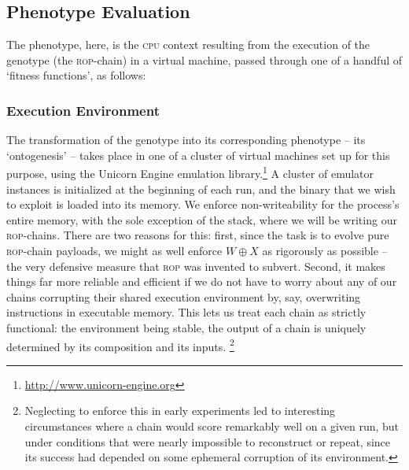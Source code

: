 \subsection{Phenotype Evaluation}
The phenotype, here, is the \textsc{cpu} context resulting from the execution of the genotype (the \textsc{rop}-chain) in a virtual machine, passed through one of a handful of `fitness functions', as follows:
\subsubsection{Execution Environment}
The transformation of the genotype into its corresponding
phenotype -- its `ontogenesis' -- takes place in one of a cluster
of virtual machines set up for this purpose, using the Unicorn Engine emulation library.\footnote{\url{http://www.unicorn-engine.org}} A cluster of
emulator instances is initialized at the beginning of each run,
and the binary that we wish to exploit is loaded into its memory.
We enforce non-writeability for the process's entire memory, with
the sole exception of the stack, where we will be writing our
\textsc{rop}-chains. There are two reasons for this: first, since
the task is to evolve pure \textsc{rop}-chain payloads, we might
as well enforce $W \oplus X$ as rigorously as possible -- the
very defensive measure that \textsc{rop} was invented to subvert.
Second, it makes things far more reliable and efficient if we
do not have to worry about any of our chains corrupting their
shared execution environment by, say, overwriting instructions in
executable memory. This lets us treat each chain as strictly
functional: the environment being stable, the output of a chain
is uniquely determined by its composition and its inputs.%
\footnote{Neglecting to enforce this in early experiments led to
  interesting circumstances where a chain would score remarkably
  well on a given run, but under conditions that were nearly
  impossible to reconstruct or repeat, since its success had
  depended on some ephemeral corruption of its environment.}

